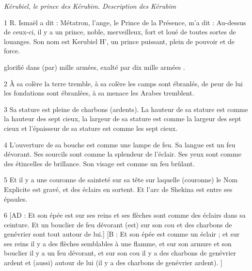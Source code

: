 \par \textit{Kérubiel, le prince des Kérubim. Description des Kérubim}

\par 1 R. Ismaël a dit : Métatron, l'ange, le Prince de la Présence, m'a dit : Au-dessus de ceux-ci, il y a un prince, noble, merveilleux, fort et loué de toutes sortes de louanges. Son nom est Kerubiel H', un prince puissant, plein de pouvoir et de force.

\par [AD : un prince d'altesse, et l'altesse (est) avec lui, un prince juste, et la justice (est) avec lui, un prince saint, et la sainteté (est) avec lui, un prince] [B : un prince de grandeur, et avec lui (il y a) un prince juste, de justice, et avec lui un prince saint, de sainteté, et avec lui (il y a) un prince ] glorifié dans (par) mille armées, exalté par dix mille armées .

\par 2 À sa colère la terre tremble, à sa colère les camps sont ébranlés, de peur de lui les fondations sont ébranlées, à sa menace les Arabes tremblent.

\par 3 Sa stature est pleine de charbons (ardents). La hauteur de sa stature est comme la hauteur des sept cieux, la largeur de sa stature est comme la largeur des sept cieux et l'épaisseur de sa stature est comme les sept cieux.

\par 4 L'ouverture de sa bouche est comme une lampe de feu. Sa langue est un feu dévorant. Ses sourcils sont comme la splendeur de l'éclair. Ses yeux sont comme des étincelles de brillance. Son visage est comme un feu brûlant.

\par 5 Et il y a une couronne de sainteté sur sa tête sur laquelle (couronne) le Nom Explicite est gravé, et des éclairs en sortent. Et l'arc de Shekina est entre ses épaules.

\par 6 [AD : Et son épée est sur ses reins et ses flèches sont comme des éclairs dans sa ceinture. Et un bouclier de feu dévorant (est) sur son cou et des charbons de genévrier sont tout autour de lui.] [B : Et son épée est comme un éclair ; et sur ses reins il y a des flèches semblables à une flamme, et sur son armure et son bouclier il y a un feu dévorant, et sur son cou il y a des charbons de genévrier ardent et (aussi) autour de lui (il y a des charbons de genévrier ardent). ]

